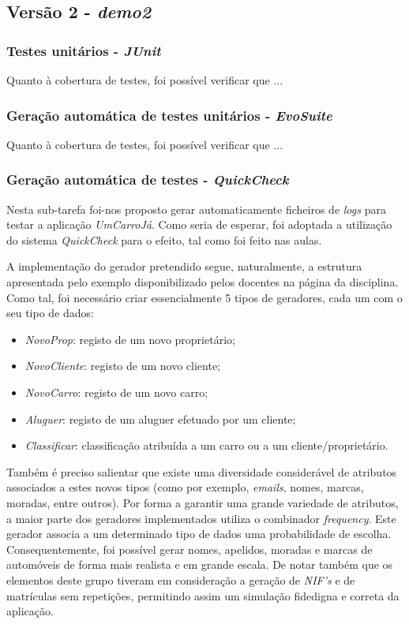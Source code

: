 \documentclass[a4paper]{report}
\begin{document}
\subsection{Versão 2 - \textit{demo2}}

\subsubsection{Testes unitários - \textit{JUnit}}

Quanto à cobertura de testes, foi possível verificar que ...

\subsubsection{Geração automática de testes unitários - \textit{EvoSuite}}

Quanto à cobertura de testes, foi possível verificar que ...

\subsubsection{Geração automática de testes - \textit{QuickCheck}}
Nesta sub-tarefa foi-nos proposto gerar automaticamente ficheiros de \textit{logs} para testar a aplicação \textit{UmCarroJá}. Como seria de esperar, foi adoptada a utilização do sistema \textit{QuickCheck} para o efeito, tal como foi feito nas aulas.

A implementação do gerador pretendido segue, naturalmente, a estrutura apresentada pelo exemplo disponibilizado pelos docentes na página da disciplina. Como tal, foi necessário criar essencialmente 5 tipos de geradores, cada um com o seu tipo de dados:
\begin{itemize}
    \item \textit{NovoProp}: registo de um novo proprietário;
    \item \textit{NovoCliente}: registo de um novo cliente;
    \item \textit{NovoCarro}: registo de um novo carro;
    \item \textit{Aluguer}: registo de um aluguer efetuado por um cliente;
    \item \textit{Classificar}: classificação atribuída a um carro ou a um cliente/proprietário.
\end{itemize}

Também é preciso salientar que existe uma diversidade considerável de atributos associados a estes novos tipos (como por exemplo, \textit{emails}, nomes, marcas, moradas, entre outros). Por forma a garantir uma grande variedade de atributos, a maior parte dos geradores implementados utiliza o combinador \textit{frequency}. Este gerador associa a um determinado tipo de dados uma probabilidade de escolha. Consequentemente, foi possível gerar nomes, apelidos, moradas e marcas de automóveis de forma mais realista e em grande escala. De notar também que os elementos deste grupo tiveram em consideração a geração de \textit{NIF's} e de matrículas sem repetições, permitindo assim um simulação fidedigna e correta da aplicação.
\end{document}
